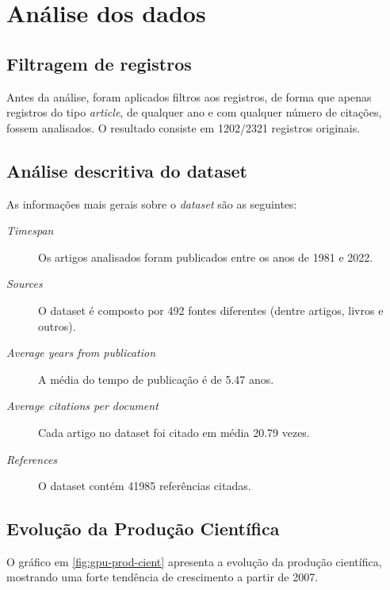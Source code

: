 \section{Análise dos dados}

\subsection{Filtragem de registros}
Antes da análise, foram aplicados filtros aos registros, de forma que apenas registros do tipo \textit{article}, de qualquer ano e com qualquer número de citações, fossem analisados. O resultado consiste em 1202/2321 registros originais.

\subsection{Análise descritiva do dataset}

As informações mais gerais sobre o \textit{dataset} são as seguintes:
\begin{description}
    \item  [\textit{Timespan}] Os artigos analisados foram publicados entre os anos de 1981 e 2022.
    \item  [\textit{Sources}] O dataset é composto por 492 fontes diferentes (dentre artigos, livros e outros).
    \item 
    [\textit{Average years from publication}] A média do tempo de publicação é de 5.47 anos.
    \item 
    [\textit{Average citations per document}] Cada artigo no dataset foi citado em média 20.79 vezes.
    \item 
    [\textit{References}] O dataset contém 41985 referências citadas.
\end{description}

\subsection{Evolução da Produção Científica}

O gráfico em \ref{fig:gpu-prod-cient} apresenta a evolução da produção científica, mostrando uma forte tendência de crescimento a partir de 2007.

